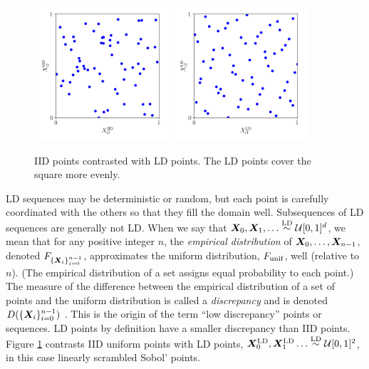 \documentclass[graybox,footinfo]{svmult}
\newcommand{\LD}{\textup{LD}}
\newcommand{\unif}{\textup{unif}}
\newcommand{\LDsim}{\overset{\LD}{\sim}}
\newcommand{\cube}{[0,1]^d}
\begin{document}
\begin{figure}
	\includegraphics[height=5cm]{QMCSoftwareArticle/figs/dd_iid_uniform_pts.png}
	\qquad
	\includegraphics[height=5cm]{QMCSoftwareArticle/figs/dd_sobol_pts.png}
	\caption{IID points contrasted with LD points.  The LD points cover the square more evenly.}
	\label{fig:comparePts}
\end{figure}

LD sequences may be deterministic or random, but each point is carefully coordinated with the others so that they fill the domain well.  Subsequences of LD sequences are generally not LD.  When we say that $\bsX_0, \bsX_1, \ldots \LDsim \calU\cube$, we mean that for any positive integer $n$,  the \emph{empirical distribution} of ${\boldsymbol{X}}_0, \ldots, {\boldsymbol{X}}_{n-1}$, denoted $F_{\{{\boldsymbol{X}}_i\}_{i=0}^{n-1}}$,  approximates the uniform distribution, $F_\unif$, well (relative to $n$).  (The empirical distribution of a set assigns equal probability to each point.)  The measure of the difference between the empirical distribution of a set of points and the uniform distribution is called a \emph{discrepancy} and is denoted $D(\{{\boldsymbol{X}}_i\}_{i=0}^{n-1})$ \cite{DicEtal14a,Hic97a,Hic99a,Nie92}.  This is the origin of the term ``low discrepancy'' points or sequences.  LD points by definition have a smaller discrepancy than IID points.  Figure \ref{fig:comparePts} contrasts IID uniform points with LD points, $\bsX^{\LD}_0, \bsX^{\LD}_1 \ldots \LDsim \calU[0,1]^2$, in this case linearly scrambled Sobol' points.
\end{document}
